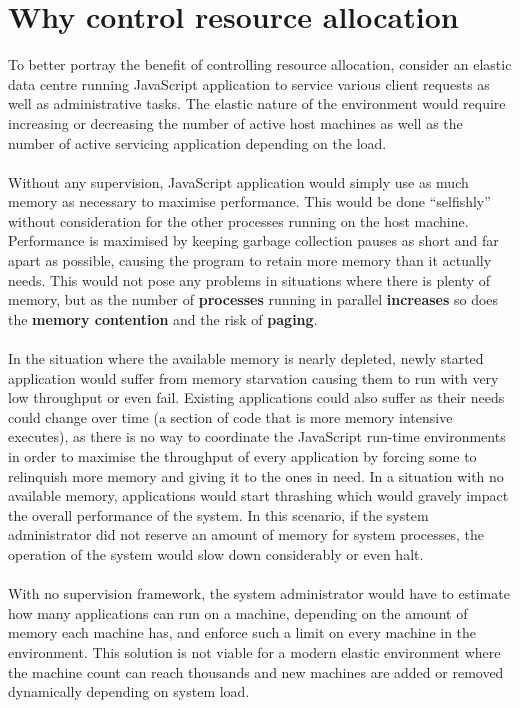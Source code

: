 \documentclass{l4proj}
\begin{document}
\section{Why control resource allocation}
\hspace*{3em} To better portray the benefit of controlling resource allocation, consider an elastic data centre running JavaScript application to service various client requests as well as administrative tasks. The elastic nature of the environment would require increasing or decreasing the number of active host machines as well as the number of active servicing application depending on the load. 
\\\\
\hspace*{3em} Without any supervision, JavaScript application would simply use as much memory as necessary to maximise performance. This would be done ``selfishly'' without consideration for the other processes running on the host machine. Performance is maximised by keeping garbage collection pauses as short and far apart as possible, causing the program to retain more memory than it actually needs. This would not pose any problems in situations where there is plenty of memory, but as the number of \textbf{processes} running in parallel \textbf{increases} so does the \textbf{memory contention} and the risk of \textbf{paging}.%
\\\\
\hspace*{3em} In the situation where the available memory is nearly depleted, newly started application would suffer from memory starvation causing them to run with very low throughput or even fail. Existing applications could also suffer as their needs could change over time (a section of code that is more memory intensive executes), as there is no way to coordinate the JavaScript run-time environments in order to maximise the throughput of every application by forcing some to relinquish more memory and giving it to the ones in need. In a situation with no available memory, applications would start thrashing which would gravely impact the overall performance of the system. In this scenario, if the system administrator did not reserve an amount of memory for system processes, the operation of the system would slow down considerably or even halt. 
\\\\
\hspace*{3em} With no supervision framework, the system administrator would have to estimate how many applications can run on a machine, depending on the amount of memory each machine has, and enforce such a limit on every machine in the environment. This solution is not viable for a modern elastic environment where the machine count can reach thousands and new machines are added or removed dynamically depending on system load. 
\end{document}
